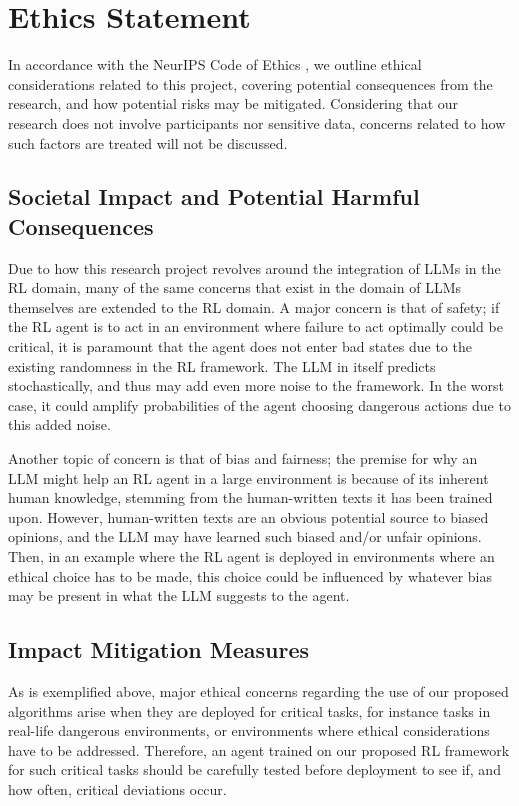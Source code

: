 \documentclass[conference]{IEEEtran}
\begin{document}
\section*{Ethics Statement}

In accordance with the NeurIPS Code of Ethics \cite{ethics}, we outline ethical considerations related to this project, covering potential consequences from the research, and how potential risks may be mitigated. Considering that our research does not involve participants nor sensitive data, concerns related to how such factors are treated will not be discussed.

\subsection{Societal Impact and Potential Harmful Consequences}

Due to how this research project revolves around the integration of LLMs in the RL domain, many of the same concerns that exist in the domain of LLMs themselves are extended to the RL domain. A major concern is that of safety; if the RL agent is to act in an environment where failure to act optimally could be critical, it is paramount that the agent does not enter bad states due to the existing randomness in the RL framework. The LLM in itself predicts stochastically, and thus may add even more noise to the framework. In the worst case, it could amplify probabilities of the agent choosing dangerous actions due to this added noise.

Another topic of concern is that of bias and fairness; the premise for why an LLM might help an RL agent in a large environment is because of its inherent human knowledge, stemming from the human-written texts it has been trained upon. However, human-written texts are an obvious potential source to biased opinions, and the LLM may have learned such biased and/or unfair opinions. Then, in an example where the RL agent is deployed in environments where an ethical choice has to be made, this choice could be influenced by whatever bias may be present in what the LLM suggests to the agent.

\subsection{Impact Mitigation Measures}

As is exemplified above, major ethical concerns regarding the use of our proposed algorithms arise when they are deployed for critical tasks, for instance tasks in real-life dangerous environments, or environments where ethical considerations have to be addressed. Therefore, an agent trained on our proposed RL framework for such critical tasks should be carefully tested before deployment to see if, and how often, critical deviations occur.
\end{document}
